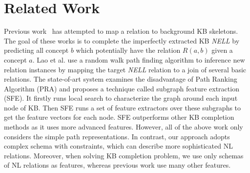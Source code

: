 \section{Related Work}

Previous work~\cite{zhang2012ontological,gardner2015efficient,gardner2014incorporating,lao2011random} has attempted to map a relation to 
background KB skeletons. 
The goal of these works is to complete the imperfectly extracted KB 
\textit{NELL} \cite{carlson2010toward} by predicting all concept $b$ 
which potentially have the relation $R(a, b)$ given a concept $a$. 
Lao et al.  use a random walk path 
finding algorithm to inference new relation instances by 
mapping the target \textit{NELL} relation to a join of 
several basic relations. The state-of-art system \cite{gardner2015efficient} 
examines the disadvantage of Path Ranking Algorithm (PRA)\cite{lao2011random} 
and proposes a technique called subgraph feature extraction (SFE). 
It firstly runs local search to characterize the graph around 
each input node of KB. Then SFE runs a set of feature extractors 
over these subgraphs to get the feature vectors for each node. 
SFE outperforms other KB completion methods as it uses 
more advanced features. However, all of the above work only 
considers the simple path representations. 
In contrast, our approach adopts complex schema 
with constraints, which can describe more sophisticated NL relations. 
Moreover, when solving KB completion problem, we use only schemas
of NL relations as features, whereas previous work use many other
features.

